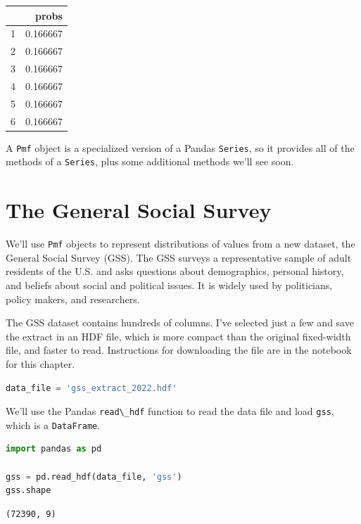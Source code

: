 \documentclass[
]{book}
\newcommand{\passthrough}[1]{#1}
\begin{document}
\begin{tabular}{lr}
\toprule
 & probs \\
\midrule
1 & 0.166667 \\
2 & 0.166667 \\
3 & 0.166667 \\
4 & 0.166667 \\
5 & 0.166667 \\
6 & 0.166667 \\
\bottomrule
\end{tabular}

A \passthrough{\lstinline!Pmf!} object is a specialized version of a
Pandas \passthrough{\lstinline!Series!}, so it provides all of the
methods of a \passthrough{\lstinline!Series!}, plus some additional
methods we'll see soon.

\section{The General Social Survey}\label{the-general-social-survey}

We'll use \passthrough{\lstinline!Pmf!} objects to represent
distributions of values from a new dataset, the General Social Survey
(GSS). The GSS surveys a representative sample of adult residents of the
U.S. and asks questions about demographics, personal history, and
beliefs about social and political issues. It is widely used by
politicians, policy makers, and researchers.

The GSS dataset contains hundreds of columns. I've selected just a few
and save the extract in an HDF file, which is more compact than the
original fixed-width file, and faster to read. Instructions for
downloading the file are in the notebook for this chapter.

\begin{lstlisting}[language=Python]
data_file = 'gss_extract_2022.hdf'
\end{lstlisting}

We'll use the Pandas \passthrough{\lstinline!read\_hdf!} function to
read the data file and load \passthrough{\lstinline!gss!}, which is a
\passthrough{\lstinline!DataFrame!}.

\begin{lstlisting}[language=Python]
import pandas as pd

gss = pd.read_hdf(data_file, 'gss')
gss.shape
\end{lstlisting}

\begin{lstlisting}
(72390, 9)
\end{lstlisting}
\end{document}
